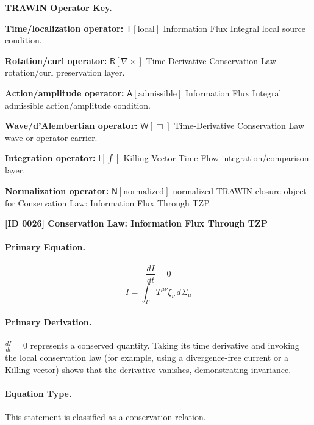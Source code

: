 \par\vspace{0.45\baselineskip}
\noindent\begin{minipage}[t]{\linewidth}
\begingroup
\small
\raggedright
\textbf{TRAWIN Operator Key.}\par
\noindent\textbf{Time/localization operator:} $\mathsf{T}\!\left[\mathrm{local}\right]$ Information Flux Integral local source condition.\par
\noindent\textbf{Rotation/curl operator:} $\mathsf{R}\!\left[\nabla\times\right]$ Time-Derivative Conservation Law rotation/curl preservation layer.\par
\noindent\textbf{Action/amplitude operator:} $\mathsf{A}\!\left[\mathrm{admissible}\right]$ Information Flux Integral admissible action/amplitude condition.\par
\noindent\textbf{Wave/d'Alembertian operator:} $\mathsf{W}\!\left[\Box\right]$ Time-Derivative Conservation Law wave or operator carrier.\par
\noindent\textbf{Integration operator:} $\mathsf{I}\!\left[\int\right]$ Killing-Vector Time Flow integration/comparison layer.\par
\noindent\textbf{Normalization operator:} $\mathsf{N}\!\left[\mathrm{normalized}\right]$ normalized TRAWIN closure object for Conservation Law: Information Flux Through TZP.\par
\endgroup
\end{minipage}

\clearpage
\noindent\textbf{[ID 0026] Conservation Law: Information Flux Through TZP}\par
\vspace{0.35em}
\paragraph{Primary Equation.}
\[
\frac{dI}{dt}=0
\]
\[
I
=
\int_{\Gamma}
T^{\mu\nu}\xi_{\nu}\, d\Sigma_{\mu}
\]

\paragraph{Primary Derivation.}
\( \frac{dI}{dt}=0 \) represents a conserved quantity. Taking its time derivative and invoking the local conservation law (for example, using a divergence-free current or a Killing vector) shows that the derivative vanishes, demonstrating invariance.
\paragraph{Equation Type.}
This statement is classified as a conservation relation.

